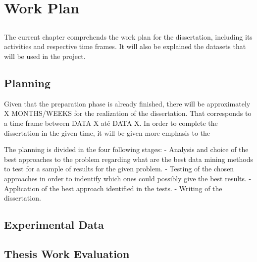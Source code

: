 \chapter{Work Plan}\label{chap:chap3}

\section*{}

The current chapter comprehends the work plan for the dissertation, including its activities and respective time frames. It will also be explained the datasets that will be used in the project.

\section*{Planning}

Given that the preparation phase is already finished, there will be approximately X MONTHS/WEEKS for the realization of the dissertation. That corresponds to a time frame between DATA X até DATA X. In order to complete the dissertation in the given time, it will be given more emphasis to the 

The planning is divided in the four following stages:
- Analysis and choice of the best approaches to the problem regarding what are the best data mining methods to test for a sample of results for the given problem.
- Testing of the chosen approaches in order to indentify which ones could possibly give the best results.
- Application of the best approach identified in the tests.
- Writing of the dissertation.


\section*{Experimental Data}


\section*{Thesis Work Evaluation}


